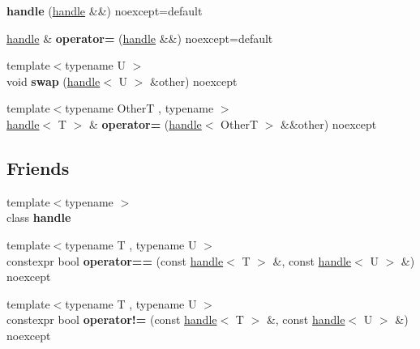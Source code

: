 \begin{DoxyCompactItemize}
{\bfseries handle} (\mbox{\hyperlink{classdistant_1_1handle}{handle}} \&\&) noexcept=default
\item 
\mbox{\label{classdistant_1_1handle_a74bb937d5bd3f82a1bbf96d4fa2202cb}} 
\mbox{\hyperlink{classdistant_1_1handle}{handle}} \& {\bfseries operator=} (\mbox{\hyperlink{classdistant_1_1handle}{handle}} \&\&) noexcept=default
\item 
\mbox{\label{classdistant_1_1handle_a8bcd9d7f086f2f2660ff1864cbd21989}} 
{\footnotesize template$<$typename U $>$ }\\void {\bfseries swap} (\mbox{\hyperlink{classdistant_1_1handle}{handle}}$<$ U $>$ \&other) noexcept
\item 
\mbox{\label{classdistant_1_1handle_a5c2bed1faa6a28060e9090fdc9536fd3}} 
{\footnotesize template$<$typename OtherT , typename $>$ }\\\mbox{\hyperlink{classdistant_1_1handle}{handle}}$<$ T $>$ \& {\bfseries operator=} (\mbox{\hyperlink{classdistant_1_1handle}{handle}}$<$ OtherT $>$ \&\&other) noexcept
\end{DoxyCompactItemize}
\subsection*{Friends}
\begin{DoxyCompactItemize}
\item 
\mbox{\label{classdistant_1_1handle_a09563db836b1abb27abbd07b38d77cf7}} 
{\footnotesize template$<$typename $>$ }\\class {\bfseries handle}
\item 
\mbox{\label{classdistant_1_1handle_aa0ed784cab3502540e32427581986e33}} 
{\footnotesize template$<$typename T , typename U $>$ }\\constexpr bool {\bfseries operator==} (const \mbox{\hyperlink{classdistant_1_1handle}{handle}}$<$ T $>$ \&, const \mbox{\hyperlink{classdistant_1_1handle}{handle}}$<$ U $>$ \&) noexcept
\item 
\mbox{\label{classdistant_1_1handle_a874fe586ac59c5b364dff2691ddbc263}} 
{\footnotesize template$<$typename T , typename U $>$ }\\constexpr bool {\bfseries operator!=} (const \mbox{\hyperlink{classdistant_1_1handle}{handle}}$<$ T $>$ \&, const \mbox{\hyperlink{classdistant_1_1handle}{handle}}$<$ U $>$ \&) noexcept
\end{DoxyCompactItemize}
